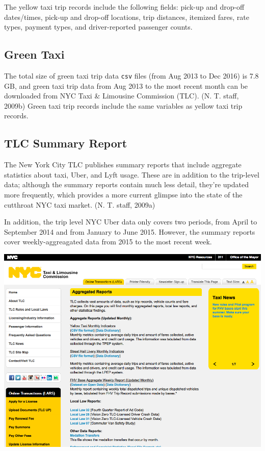 \documentclass[12pt,twoside]{reedthesis}
\theoremstyle{definition}
\theoremstyle{definition}
\theoremstyle{definition}
\theoremstyle{remark}
\begin{document}
The yellow taxi trip records include the following fields: pick-up and
drop-off dates/times, pick-up and drop-off locations, trip distances,
itemized fares, rate types, payment types, and driver-reported passenger
counts.

\subsection{Green Taxi}\label{green-taxi-1}

The total size of green taxi trip data \texttt{csv} files (from Aug 2013
to Dec 2016) is 7.8 GB, and green taxi trip data from Aug 2013 to the
most recent month can be downloaded from NYC Taxi \& Limousine
Commission (TLC). (N. T. staff, 2009b) Green taxi trip records include
the same variables as yellow taxi trip records.

\subsection{TLC Summary Report}\label{tlc-summary-report}

The New York City TLC publishes summary reports that include aggregate
statistics about taxi, Uber, and Lyft usage. These are in addition to
the trip-level data; although the summary reports contain much less
detail, they're updated more frequently, which provides a more current
glimpse into the state of the cutthroat NYC taxi market. (N. T. staff,
2009a)

In addition, the trip level NYC Uber data only covers two periods, from
April to September 2014 and from January to June 2015. However, the
summary reports cover weekly-aggreagated data from 2015 to the most
recent week.
\begin{center}\includegraphics[width=5.84in]{figure/a-report} \end{center}
\end{document}
